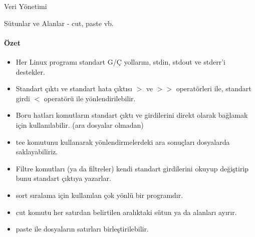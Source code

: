 \begin{section}{Veri Yönetimi}
\begin{subsection}{Sütunlar ve Alanlar - cut, paste vb.}
\paragraph{Özet}{
\begin{itemize}
\item Her Linux programı standart G/Ç yollarını, stdin, stdout ve stderr'i destekler. 
\item Standart çıktı ve standart hata çıktısı $>$ ve $>>$ operatörleri ile, standart girdi $<$ operatörü ile yönlendirilebilir.
\item Boru hatları komutların standart çıktı ve girdilerini direkt olarak bağlamak için kullanılabilir. (ara dosyalar olmadan)
\item tee komutunu kullanarak yönlendirmelerdeki ara sonuçları dosyalarda saklayabiliriz. 
\item Filtre komutları (ya da filtreler) kendi standart girdilerini okuyup değiştirip bunu standart çıktıya yazarlar. 
\item sort sıralama için kullanılan çok yönlü bir programdır. 
\item cut komutu her satırdan belirtilen aralıktaki sütun ya da alanları ayırır.
\item paste ile dosyaların satırları birleştirilebilir. 
\end{itemize}}
\end{subsection}
\end{section}